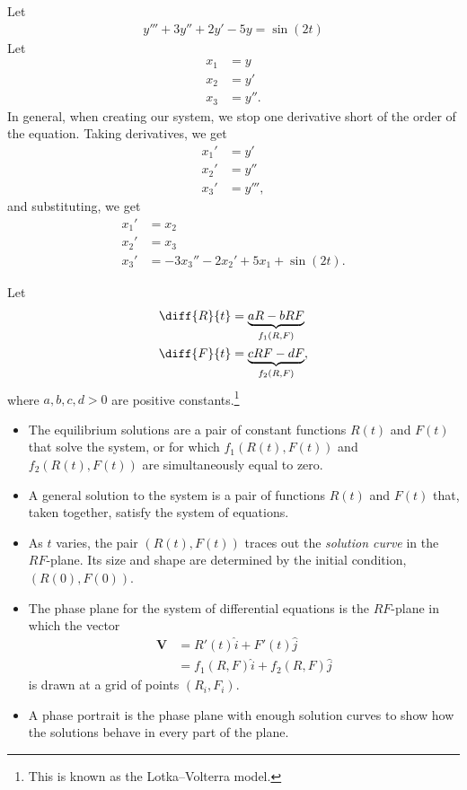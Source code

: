 \documentclass[10pt]{mypackage}
\begin{document}
\begin{example}
  Let
  \begin{align*}
    y''' + 3y'' + 2y' - 5y = \sin(2t)
  \end{align*}
  Let
  \begin{align*}
    x_1 &= y\\
    x_2 &= y'\\
    x_3 &= y''.
  \end{align*}
  In general, when creating our system, we stop one derivative short of the order of the equation. Taking derivatives, we get
  \begin{align*}
    x_1' &= y'\\
    x_2' &= y''\\
    x_3' &= y''',
  \end{align*}
  and substituting, we get
  \begin{align*}
    x_1' &= x_2\\
    x_2' &= x_3\\
    x_3' &= -3x_3'' - 2x_2' + 5x_1 + \sin(2t).
  \end{align*}
\end{example}
\begin{definition}
  Let
  \begin{align*}
    \diff{R}{t} &= \underbrace{aR - bRF}_{f_1(R,F)}\\
    \diff{F}{t} &= \underbrace{cRF - dF}_{f_2(R,F)},
  \end{align*}
  where $a,b,c,d > 0$ are positive constants.\footnote{This is known as the Lotka--Volterra model.}
  \begin{itemize}
    \item The equilibrium solutions are a pair of constant functions $R(t)$ and $F(t)$ that solve the system, or for which $f_1(R(t),F(t))$ and $f_2(R(t),F(t))$ are simultaneously equal to zero.
    \item A general solution to the system is a pair of functions $R(t)$ and $F(t)$ that, taken together, satisfy the system of equations.
    \item As $t$ varies, the pair $\left(R(t),F(t)\right)$ traces out the \textit{solution curve} in the $RF$-plane. Its size and shape are determined by the initial condition, $\left(R(0),F(0)\right)$.
    \item The phase plane for the system of differential equations is the $RF$-plane in which the vector 
      \begin{align*}
        \mathbf{V} &= R'(t)\hat{i} + F'(t)\hat{j}\\
                   &= f_1\left(R,F\right)\hat{i} + f_2\left(R,F\right)\hat{j}
      \end{align*}
      is drawn at a grid of points $\left(R_i,F_i\right)$.
    \item A phase portrait is the phase plane with enough solution curves to show how the solutions behave in every part of the plane.
  \end{itemize}
\end{definition}
\end{document}
